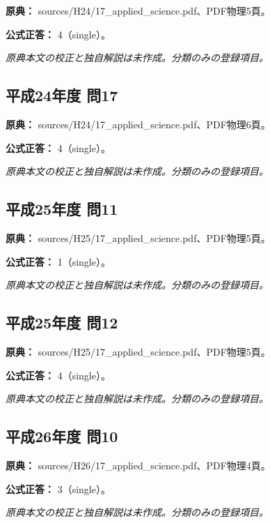 \noindent\textbf{原典：} sources/H24/17\_applied\_science.pdf、PDF物理5頁。

\textbf{公式正答：} 4（single）。

\par\textit{原典本文の校正と独自解説は未作成。分類のみの登録項目。}

\subsection{平成24年度 問17}
\label{q:h24-reg-applied-17}

\noindent\textbf{原典：} sources/H24/17\_applied\_science.pdf、PDF物理6頁。

\textbf{公式正答：} 4（single）。

\par\textit{原典本文の校正と独自解説は未作成。分類のみの登録項目。}

\subsection{平成25年度 問11}
\label{q:h25-reg-applied-11}

\noindent\textbf{原典：} sources/H25/17\_applied\_science.pdf、PDF物理5頁。

\textbf{公式正答：} 1（single）。

\par\textit{原典本文の校正と独自解説は未作成。分類のみの登録項目。}

\subsection{平成25年度 問12}
\label{q:h25-reg-applied-12}

\noindent\textbf{原典：} sources/H25/17\_applied\_science.pdf、PDF物理5頁。

\textbf{公式正答：} 4（single）。

\par\textit{原典本文の校正と独自解説は未作成。分類のみの登録項目。}

\subsection{平成26年度 問10}
\label{q:h26-reg-applied-10}

\noindent\textbf{原典：} sources/H26/17\_applied\_science.pdf、PDF物理4頁。

\textbf{公式正答：} 3（single）。

\par\textit{原典本文の校正と独自解説は未作成。分類のみの登録項目。}

